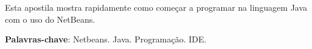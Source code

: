 \documentclass[
	12pt,				%
	twoside,			%
	a4paper,			%
	english,			%
	french,				%
	spanish,			%
	brazil				%
	]{abntex2}
\begin{document}

%
%



\setlength{\absparsep}{18pt} %
\begin{resumo}
Esta apostila mostra rapidamente como começar a programar na linguagem Java com o uso do NetBeans.

 \textbf{Palavras-chave}: Netbeans. Java. Programação. IDE.
\end{resumo}

%
% 

% 
\end{document}
